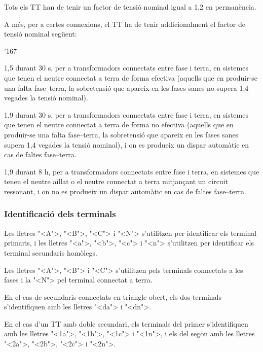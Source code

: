 Tots els  TT han de tenir un factor de tensi\'{o} nominal igual a 1,2 en perman\`{e}ncia.

A m\'{e}s, per a certes connexions, el TT ha de tenir addicionalment el factor de tensi\'{o}
nominal seg\"{u}ent:
 \begin{dinglist}{'167}
   \item 1,5 durant 30 s,  per a transformadors connectats entre fase i terra, en sistemes que tenen el neutre connectat a terra de forma efectiva (aquells que en produir-se una falta fase--terra, la sobretensi\'{o} que apareix en les fases sanes no supera 1,4 vegades la tensi\'{o} nominal).
   \item 1,9 durant 30 s,  per a transformadors connectats entre fase i terra, en sistemes que tenen el neutre connectat a terra de forma no efectiva (aquells que en produir-se una falta fase--terra, la sobretensi\'{o} que apareix en les fases sanes  supera 1,4 vegades la tensi\'{o} nominal), i on es produeix un dispar  autom\`{a}tic en cas de faltes fase--terra.
   \item 1,9 durant 8 h,  per a transformadors connectats entre fase i terra, en sistemes que tenen el neutre a\"{\i}llat o el neutre connectat a terra mitjan\c{c}ant un circuit ressonant, i on no es produeix un dispar  autom\`{a}tic en cas de faltes fase--terra.
\end{dinglist}

\subsubsection{Identificaci\'{o} dels terminals}

 Les lletres {"<}A{">}, {"<}B{">}, {"<}C{">} i {"<}N{">} s'utilitzen per identificar els terminal primaris, i les lletres {"<}a{">}, {"<}b{">}, {"<}c{">} i {"<}n{">} s'utilitzen per identificar els terminal secundaris hom\`{o}legs.

 Les lletres {"<}A{">}, {"<}B{">} i {"<}C{">} s'utilitzen pels terminals connectats a les fases i la {"<}N{">} pel terminal connectat a terra.

 En el cas de secundaris connectats en triangle obert, els dos terminals s'identifiquen amb les lletres {"<}da{">} i {"<}dn{">}.

 En el cas d'un TT amb doble secundari, els terminals del  primer s'identifiquen amb les lletres  {"<}1a{">}, {"<}1b{">}, {"<}1c{">} i {"<}1n{">}, i els del segon amb les lletres  {"<}2a{">}, {"<}2b{">}, {"<}2c{">} i {"<}2n{">}.

